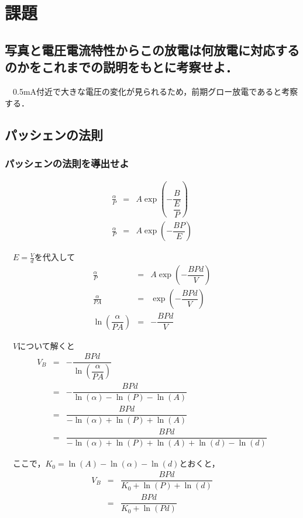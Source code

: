 



\fontsize{11.041pt}{16.562pt}\selectfont

\section{課題}
\subsection{写真と電圧電流特性からこの放電は何放電に対応するのかをこれまでの説明をもとに考察せよ．}
　0.5mA付近で大きな電圧の変化が見られるため，前期グロー放電であると考察する．

\newpage
\subsection{パッシェンの法則}
\subsubsection{パッシェンの法則を導出せよ}
\begin{eqnarray}
    \frac{\alpha}{P} &=& A \exp \left(-\dfrac{B}{\dfrac{E}{P}}\right) \nonumber\\
    \frac{\alpha}{P} &=& A \exp \left(-\dfrac{BP}{E}\right) \nonumber
\end{eqnarray}

　$E = \frac{V}{d}$を代入して
\begin{eqnarray}
    \frac{\alpha}{P} &=& A \exp \left(-\dfrac{BPd}{V}\right) \nonumber\\
    \frac{\alpha}{PA} &=& \exp \left(-\dfrac{BPd}{V}\right) \nonumber\\
    \ln\left(\dfrac{\alpha}{PA}\right) &=& -\dfrac{BPd}{V} \nonumber
\end{eqnarray}

　$V$について解くと
\begin{eqnarray}
    V_B &=& -\dfrac{BPd}{\ln\left(\dfrac{\alpha}{PA}\right)} \nonumber\\
        &=& -\dfrac{BPd}{\ln(\alpha) - \ln(P) - \ln(A)} \nonumber\\
        &=& \dfrac{BPd}{-\ln(\alpha) + \ln(P) + \ln(A)} \nonumber\\
        &=& \dfrac{BPd}{-\ln(\alpha) + \ln(P) + \ln(A) + \ln(d) - \ln(d)} \nonumber
\end{eqnarray}

　ここで，$K_0 = \ln(A) - \ln(\alpha)  - \ln(d)$とおくと，
\begin{eqnarray}
    V_B &=& \dfrac{BPd}{K_0 + \ln(P) + \ln(d)} \nonumber\\
        &=& \dfrac{BPd}{K_0 + \ln(Pd)} \nonumber
\end{eqnarray}

